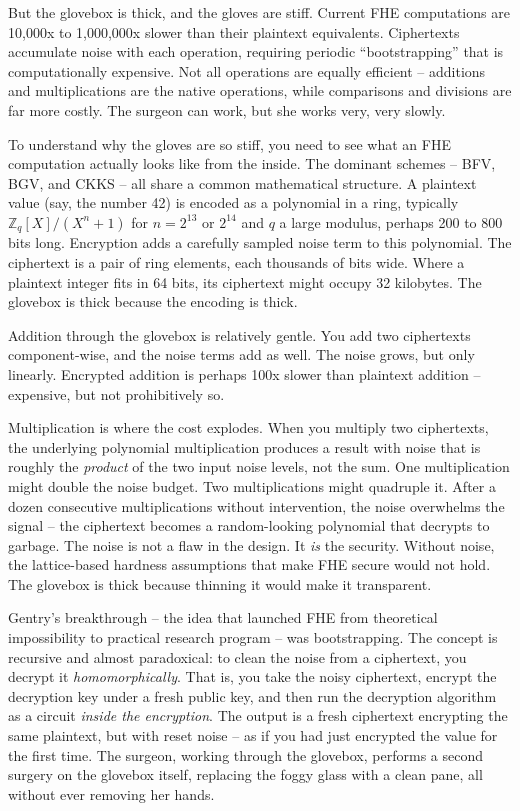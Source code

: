 \documentclass[
  11pt,
  openany]{report}
\begin{document}
But the glovebox is thick, and the gloves are stiff. Current FHE computations
are 10,000x to 1,000,000x slower than their plaintext equivalents. Ciphertexts
accumulate noise with each operation, requiring periodic ``bootstrapping'' that
is computationally expensive. Not all operations are equally efficient --
additions and multiplications are the native operations, while comparisons and
divisions are far more costly. The surgeon can work, but she works very, very
slowly.

To understand why the gloves are so stiff, you need to see what an FHE
computation actually looks like from the inside. The dominant schemes -- BFV,
BGV, and CKKS -- all share a common mathematical structure. A plaintext value
(say, the number 42) is encoded as a polynomial in a ring, typically
\(\mathbb{Z}_q[X]/(X^n + 1)\) for \(n = 2^{13}\) or \(2^{14}\) and \(q\) a large
modulus, perhaps 200 to 800 bits long. Encryption adds a carefully sampled noise
term to this polynomial. The ciphertext is a pair of ring elements, each
thousands of bits wide. Where a plaintext integer fits in 64 bits, its
ciphertext might occupy 32 kilobytes. The glovebox is thick because the encoding
is thick.

Addition through the glovebox is relatively gentle. You add two ciphertexts
component-wise, and the noise terms add as well. The noise grows, but only
linearly. Encrypted addition is perhaps 100x slower than plaintext addition --
expensive, but not prohibitively so.

Multiplication is where the cost explodes. When you multiply two ciphertexts,
the underlying polynomial multiplication produces a result with noise that is
roughly the \emph{product} of the two input noise levels, not the sum. One
multiplication might double the noise budget. Two multiplications might
quadruple it. After a dozen consecutive multiplications without intervention,
the noise overwhelms the signal -- the ciphertext becomes a random-looking
polynomial that decrypts to garbage. The noise is not a flaw in the design. It
\emph{is} the security. Without noise, the lattice-based hardness assumptions
that make FHE secure would not hold. The glovebox is thick because thinning it
would make it transparent.

Gentry's breakthrough -- the idea that launched FHE from theoretical
impossibility to practical research program -- was bootstrapping. The concept is
recursive and almost paradoxical: to clean the noise from a ciphertext, you
decrypt it \emph{homomorphically}. That is, you take the noisy ciphertext,
encrypt the decryption key under a fresh public key, and then run the decryption
algorithm as a circuit \emph{inside the encryption}. The output is a fresh
ciphertext encrypting the same plaintext, but with reset noise -- as if you had
just encrypted the value for the first time. The surgeon, working through the
glovebox, performs a second surgery on the glovebox itself, replacing the foggy
glass with a clean pane, all without ever removing her hands.
\end{document}
